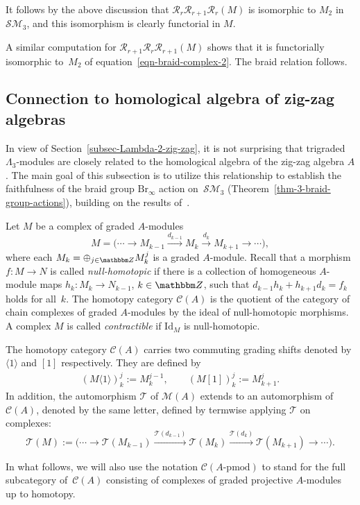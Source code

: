 \documentclass[pdftex]{sigma}
\theoremstyle{definition}
\numberwithin{equation}{section}
\def\Z{{\mathbbm Z}}
\def\lra{{\longrightarrow}}
\def\pmod{{\mathrm{\mbox{-}pmod}}} %
\def\mc{\mathcal}
\begin{document}
It follows by the above discussion that $\mc{R}_r\mc{R}_{r+1}\mc{R}_r(M)$ is isomorphic to $M_2$ in $\mc{SM}_3$, and this isomorphism is clearly functorial in $M$.

A similar computation for $\mc{R}_{r+1}\mc{R}_{r}\mc{R}_{r+1}(M)$ shows that it is functorially isomorphic to~$M_2$ of equation~\eqref{eqn-braid-complex-2}. The braid relation follows.

\subsection{Connection to homological algebra of zig-zag algebras}
In view of Section~\ref{subsec-Lambda-2-zig-zag}, it is not surprising that trigraded $\Lambda_3$-modules are closely related to the homological algebra of the zig-zag algebra $A$. The main goal of this subsection is to utilize this relationship to establish the faithfulness of the braid group $\mathrm{Br}_\infty$ action on~$\mc{SM}_3$ (Theorem~\ref{thm-3-braid-group-actions}), building on the results of~\cite{KhSe}.

Let $M$ be a complex of graded $A$-modules
\[
M=\Big(
\cdots \lra M_{k-1} \stackrel{d_{k-1}}{\lra} M_k \stackrel{d_k}{\lra} M_{k+1} \lra \cdots
\Big),
\]
where each $M_k=\oplus_{j\in \Z}M_{k}^j$ is a graded $A$-module.
Recall that a morphism $f\colon M\lra N$ is called \emph{null-homotopic} if there is a collection of homogeneous $A$-module maps $h_k\colon M_{k}\lra N_{k-1}$, $k\in \Z$, such that $d_{k-1}h_{k}+h_{k+1}d_k=f_k$ holds for all~$k$. The homotopy category $\mc{C}(A)$ is the quotient of the category of chain complexes of graded $A$-modules by the ideal of null-homotopic morphisms. A complex $M$ is called \emph{contractible} if $\mathrm{Id}_M$ is null-homotopic.

The homotopy category $\mc{C}(A)$ carries two commuting grading shifts denoted by $\langle 1 \rangle$ and $[1]$ respectively. They are defined by
\begin{gather*}
 ( M\langle 1 \rangle )^j_k:=M^{j-1}_k,\qquad (M[1] )^j_k:=M^{j}_{k+1}.
\end{gather*}
In addition, the automorphism $\mc{T}$ of $\mc{M}(A)$ extends to an automorphism of $\mc{C}(A)$, denoted by the same letter, defined by termwise applying $\mc{T}$ on complexes:
\[
\mc{T}(M):=\Big(
\cdots \lra \mc{T}(M_{k-1}) \xrightarrow{\mc{T}(d_{k-1})} \mc{T}(M_k) \xrightarrow{\mc{T}(d_k)} \mc{T}(M_{k+1}) \lra \cdots
\Big).
\]

In what follows, we will also use the notation $\mc{C}(A\pmod)$ to stand for the full subcategory of~$\mc{C}(A)$ consisting of complexes of graded projective $A$-modules up to homotopy.
\end{document}
